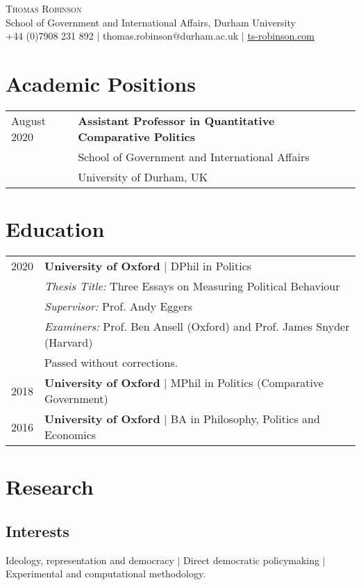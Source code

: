 \documentclass[11pt, a4paper]{article}
\begin{document}
 \begin{center}
    \textsc{\huge Thomas Robinson} \\
    School of Government and International Affairs, Durham University \\
    +44 (0)7908 231 892 $|$ thomas.robinson@durham.ac.uk $|$ \href{https://ts-robinson.com}{ts-robinson.com}
 \end{center}

\section*{Academic Positions}
\begin{tabular}{ll}
    August 2020 & \textbf{Assistant Professor in Quantitative Comparative Politics} \\
    & School of Government and International Affairs \\
    & University of Durham, UK \\

 \end{tabular}

 \section*{Education}
 \begin{tabular}{ll}
    2020 & \textbf{University of Oxford} $|$ DPhil in Politics \\
    	 & \textit{Thesis Title:} Three Essays on Measuring Political Behaviour \\
    	 & \textit{Supervisor:} Prof. Andy Eggers\\
    	 & \textit{Examiners:} Prof. Ben Ansell (Oxford) and Prof. James Snyder (Harvard) \\
    	 & Passed without corrections. \\
    2018  & \textbf{University of Oxford} $|$ MPhil in Politics (Comparative Government) \\
    2016 & \textbf{University of Oxford} $|$ BA in Philosophy, Politics and Economics
 \end{tabular}

 \section*{Research}

 \subsection*{Interests}
 Ideology, representation and democracy $|$ Direct democratic policymaking $|$ Experimental and computational methodology.
\end{document}
